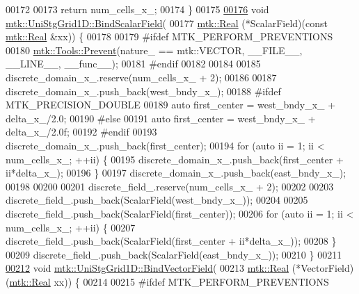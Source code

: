 \begin{DoxyCode}
00172 
00173   \textcolor{keywordflow}{return} num\_cells\_x\_;
00174 \}
00175 
\hypertarget{mtk__uni__stg__grid__1d_8cc_source_l00176}{}\hyperlink{classmtk_1_1UniStgGrid1D_ab49f0009b66b0a58ae7f70a538f4d12b}{00176} \textcolor{keywordtype}{void} \hyperlink{classmtk_1_1UniStgGrid1D_ab49f0009b66b0a58ae7f70a538f4d12b}{mtk::UniStgGrid1D::BindScalarField}(
00177     \hyperlink{group__c01-roots_gac080bbbf5cbb5502c9f00405f894857d}{mtk::Real} (*ScalarField)(\textcolor{keyword}{const} \hyperlink{group__c01-roots_gac080bbbf5cbb5502c9f00405f894857d}{mtk::Real} &xx)) \{
00178 
00179 \textcolor{preprocessor}{  #ifdef MTK\_PERFORM\_PREVENTIONS}
00180   \hyperlink{classmtk_1_1Tools_a332324c6f25e66be9dff48c5987a3b9f}{mtk::Tools::Prevent}(nature\_ == mtk::VECTOR, \_\_FILE\_\_, \_\_LINE\_\_, \_\_func\_\_);
00181 \textcolor{preprocessor}{  #endif}
00182 
00184 
00185   discrete\_domain\_x\_.reserve(num\_cells\_x\_ + 2);
00186 
00187   discrete\_domain\_x\_.push\_back(west\_bndy\_x\_);
00188 \textcolor{preprocessor}{  #ifdef MTK\_PRECISION\_DOUBLE}
00189   \textcolor{keyword}{auto} first\_center = west\_bndy\_x\_ + delta\_x\_/2.0;
00190 \textcolor{preprocessor}{  #else}
00191   \textcolor{keyword}{auto} first\_center = west\_bndy\_x\_ + delta\_x\_/2.0f;
00192 \textcolor{preprocessor}{  #endif}
00193   discrete\_domain\_x\_.push\_back(first\_center);
00194   \textcolor{keywordflow}{for} (\textcolor{keyword}{auto} ii = 1; ii < num\_cells\_x\_; ++ii) \{
00195     discrete\_domain\_x\_.push\_back(first\_center + ii*delta\_x\_);
00196   \}
00197   discrete\_domain\_x\_.push\_back(east\_bndy\_x\_);
00198 
00200 
00201   discrete\_field\_.reserve(num\_cells\_x\_ + 2);
00202 
00203   discrete\_field\_.push\_back(ScalarField(west\_bndy\_x\_));
00204 
00205   discrete\_field\_.push\_back(ScalarField(first\_center));
00206   \textcolor{keywordflow}{for} (\textcolor{keyword}{auto} ii = 1; ii < num\_cells\_x\_; ++ii) \{
00207     discrete\_field\_.push\_back(ScalarField(first\_center + ii*delta\_x\_));
00208   \}
00209   discrete\_field\_.push\_back(ScalarField(east\_bndy\_x\_));
00210 \}
00211 
\hypertarget{mtk__uni__stg__grid__1d_8cc_source_l00212}{}\hyperlink{classmtk_1_1UniStgGrid1D_a5703f1f875f52f6de8f7db5a6250fafa}{00212} \textcolor{keywordtype}{void} \hyperlink{classmtk_1_1UniStgGrid1D_a5703f1f875f52f6de8f7db5a6250fafa}{mtk::UniStgGrid1D::BindVectorField}(
00213     \hyperlink{group__c01-roots_gac080bbbf5cbb5502c9f00405f894857d}{mtk::Real} (*VectorField)(\hyperlink{group__c01-roots_gac080bbbf5cbb5502c9f00405f894857d}{mtk::Real} xx)) \{
00214 
00215 \textcolor{preprocessor}{  #ifdef MTK\_PERFORM\_PREVENTIONS}

\end{DoxyCode}
